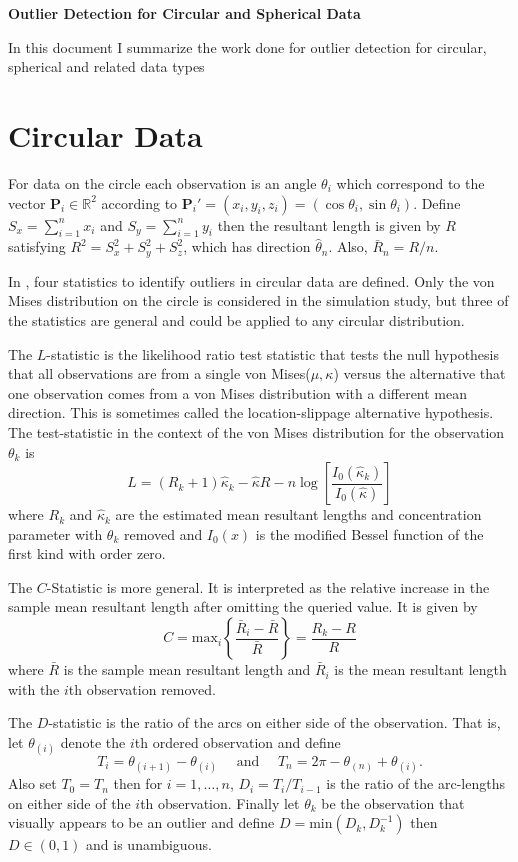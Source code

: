 \documentclass{article}\usepackage[]{graphicx}\usepackage[]{color}
\newcommand{\R}{{\mathbb{R}}}
\begin{document}
\begin{center}
\Large{\bf Outlier Detection for Circular and Spherical Data}
\end{center}
\normalsize
In this document I summarize the work done for outlier detection for circular, spherical and related data types

\section{Circular Data}\label{sec:circle}

For data on the circle each observation is an angle $\theta_i$ which correspond to the vector $\bm P_i\in \R^2$ according to $\bm P_i'=(x_i,y_i,z_i)=(\cos\theta_i,\sin\theta_i)$.  Define $S_x=\sum_{i=1}^nx_i$ and $S_y=\sum_{i=1}^ny_i$ then the resultant length is given by $R$ satisfying $R^2=S_x^2+S_y^2+S_z^2$, which has direction $\hat\theta_n$.  Also, $\bar{R}_n=R/n$.

In \cite{collett1980}, four statistics to identify outliers in circular data are defined.  Only the von Mises distribution on the circle is considered in the simulation study, but three of the statistics are general and could be applied to any circular distribution. 

The $L$-statistic is the likelihood ratio test statistic that tests the null hypothesis that all observations are from a single von Mises($\mu,\kappa$) versus the alternative that one observation comes from a von Mises distribution with a different mean direction.  This is sometimes called the location-slippage alternative hypothesis.  The test-statistic in the context of the von Mises distribution for the observation $\theta_k$ is
\[
L=(R_k+1)\hat{\kappa}_k-\hat{\kappa}R-n\log\left[\frac{I_0(\hat{\kappa}_k)}{I_0(\hat{\kappa})}\right]
\]
where $R_k$ and $\hat\kappa_k$ are the estimated mean resultant lengths and concentration parameter with $\theta_k$ removed and $I_0(x)$ is the modified Bessel function of the first kind with order zero.

The $C$-Statistic is more general.  It is interpreted as the relative increase in the sample mean resultant length after omitting the queried value.  It is given by
\[
C=\text{max}_i\left\{\frac{\bar{R}_i-\bar{R}}{\bar{R}}\right\}=\frac{R_k-R}{R}
\]
where $\bar{R}$ is the sample mean resultant length and $\bar{R}_i$ is the mean resultant length with the $i$th observation removed.  

The $D$-statistic is the ratio of the arcs on either side of the observation.  That is, let $\theta_{(i)}$ denote the $i$th ordered observation and define
\[
T_i=\theta_{(i+1)}-\theta_{(i)}\hspace{1em}\text{ and }\hspace{1em}T_n=2\pi-\theta_{(n)}+\theta_{(i)}.
\]
 Also set $T_{0}=T_{n}$ then for $i=1,\dots,n$, $D_i=T_i/T_{i-1}$ is the ratio of the arc-lengths on either side of the $i$th observation.  Finally let $\theta_k$ be the observation that visually appears to be an outlier and define $D=\text{min}(D_k,D_{k}^{-1})$ then $D\in(0,1)$ and is unambiguous.
\end{document}
